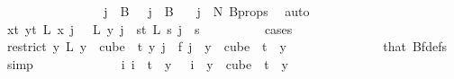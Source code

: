 \begin{isabellebody}
\ \ \ \ \ \ \isamarkupfalse%
{\isacharminus}{\kern0pt}\isanewline
\ \ \ \ \ \ \ \ \isamarkupfalse%
\ {\isachardoublequoteopen}j\ {\isasymin}\ B\ {}{\isachardoublequoteclose}\ {\isacharbar}{\kern0pt}\ {\isachardoublequoteopen}j\ {\isasymin}\ B\ {}{\isachardoublequoteclose}\ \isamarkupfalse%
\ {\isacartoucheopen}j\ {\isacharless}{\kern0pt}\ N{\isacharprime}{\kern0pt}{\isacartoucheclose}\ B{\isacharunderscore}{\kern0pt}props\ \isamarkupfalse%
\ auto\isanewline
\ \ \ \ \ \ \ \ \isamarkupfalse%
\ \isamarkupfalse%
\ {\isachardoublequoteopen}{\isacharparenleft}{\kern0pt}{\isasymforall}x{\isacharless}{\kern0pt}t{\isacharplus}{\kern0pt}{}{\isachardot}{\kern0pt}\ {\isasymforall}y{\isacharless}{\kern0pt}t{\isacharplus}{\kern0pt}{}{\isachardot}{\kern0pt}\ L{\isacharprime}{\kern0pt}\ x\ j\ {\isacharequal}{\kern0pt}\ \ L{\isacharprime}{\kern0pt}\ y\ j{\isacharparenright}{\kern0pt}\ {\isasymor}\ {\isacharparenleft}{\kern0pt}{\isasymforall}s{\isacharless}{\kern0pt}t{\isacharplus}{\kern0pt}{}{\isachardot}{\kern0pt}\ L{\isacharprime}{\kern0pt}\ s\ j\ {\isacharequal}{\kern0pt}\ s{\isacharparenright}{\kern0pt}{\isachardoublequoteclose}\isanewline
\ \ \ \ \ \ \ \ \isamarkupfalse%
\ {\isacharparenleft}{\kern0pt}cases{\isacharparenright}{\kern0pt}\isanewline
\ \ \ \ \ \ \ \ \ \ \isamarkupfalse%
\ {}\isanewline
\ \ \ \ \ \ \ \ \ \ \isamarkupfalse%
\ \isamarkupfalse%
\ {\isachardoublequoteopen}{\isacharparenleft}{\kern0pt}restrict\ {\isacharparenleft}{\kern0pt}{\isasymlambda}y{\isachardot}{\kern0pt}\ L\ {\isacharparenleft}{\kern0pt}y\ {}{\isacharparenright}{\kern0pt}{\isacharparenright}{\kern0pt}\ {\isacharparenleft}{\kern0pt}cube\ {}\ t{\isacharparenright}{\kern0pt}{\isacharparenright}{\kern0pt}\ y\ j\ {\isacharequal}{\kern0pt}\ f\ j{\isachardoublequoteclose}\ \ {\isachardoublequoteopen}y\ {\isasymin}\ cube\ {}\ t{\isachardoublequoteclose}\ \ y\ \isanewline
\ \ \ \ \ \ \ \ \ \ \ \ \isamarkupfalse%
\ that\ Bf{\isacharunderscore}{\kern0pt}defs\ \isamarkupfalse%
\ simp\isanewline
\ \ \ \ \ \ \ \ \ \ \isamarkupfalse%
\ \isamarkupfalse%
\ {\isachardoublequoteopen}{\isasymexists}{\isacharbang}{\kern0pt}i{\isachardot}{\kern0pt}\ i\ {\isacharless}{\kern0pt}\ t\ {\isasymand}\ y\ {}\ {\isacharequal}{\kern0pt}\ i{\isachardoublequoteclose}\ \ {\isachardoublequoteopen}y\ {\isasymin}\ cube\ {}\ t{\isachardoublequoteclose}\ \ y\ \isanewline

\end{isabellebody}
